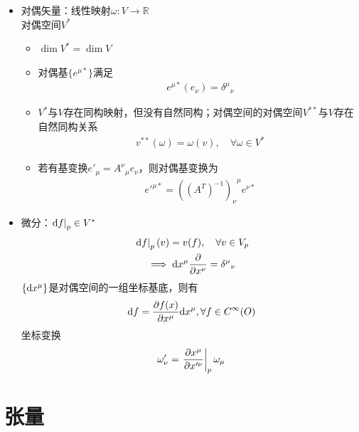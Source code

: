 \begin{itemize}
    \item 对偶矢量：线性映射$\omega:V \to \mathbb{R}$\\
    对偶空间$V^{*}$
    \begin{itemize}
        \item $\dim V^{*}=\dim V$
        \item 对偶基$\{e^{\mu *}\}$满足
        \begin{gather*}
            e^{\mu *}(e_{\nu})={\delta^\mu}_\nu
        \end{gather*}
        \item $V^{*}$与$V$存在同构映射，但没有自然同构；对偶空间的对偶空间$V^{**}$与$V$存在自然同构关系
        \begin{gather*}
            v^{**}(\omega)=\omega(v),\quad \forall \omega \in V^*
        \end{gather*}
        \item 若有基变换$e'_{\mu}={A^\nu}_\mu e_\nu$，则对偶基变换为
        \begin{gather*}
            e'^{\mu *}={((A^T)^{-1})_{\nu}}^\mu e^{\nu *}
        \end{gather*}
    \end{itemize}
    \item 微分：$\left. \mathrm{d} f \right|_p \in V^*$
    \begin{gather*}
        \left. \mathrm{d} f \right|_p(v)=v(f),\quad \forall v \in V_p
        \\
        \implies \mathrm{d} x^\mu \frac{\partial }{\partial x^\nu}={\delta^\mu}_\nu
    \end{gather*}
    $\{\mathrm{d} x^{\mu}\}$是对偶空间的一组坐标基底，则有
    \begin{gather*}
        \mathrm{d} f=\frac{\partial f(x)}{\partial x^\mu} \mathrm{d} x^\mu,\forall f \in C^{\infty}(O)
    \end{gather*}
    坐标变换
    \begin{gather*}
        \omega'_\nu=\left.\frac{\partial x^{\mu}}{\partial x'^{\nu}} \right|_p \omega_{\mu}
    \end{gather*}
\end{itemize}

\section{张量}

